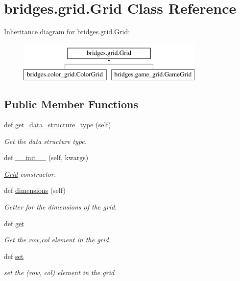 \hypertarget{classbridges_1_1grid_1_1_grid}{}\section{bridges.\+grid.\+Grid Class Reference}
\label{classbridges_1_1grid_1_1_grid}
Inheritance diagram for bridges.\+grid.\+Grid\+:\begin{figure}[H]
\begin{center}
\leavevmode
\includegraphics[height=2.000000cm]{classbridges_1_1grid_1_1_grid}
\end{center}
\end{figure}
\subsection*{Public Member Functions}
\begin{DoxyCompactItemize}
\item 
def \hyperlink{classbridges_1_1grid_1_1_grid_ab1a040a486bbad5259fec54fb885eac1}{get\+\_\+data\+\_\+structure\+\_\+type} (self)
\begin{DoxyCompactList}\small\item\em Get the data structure type. \end{DoxyCompactList}\item 
def \hyperlink{classbridges_1_1grid_1_1_grid_a25587e3c0f450b336fc7bb11fc718c36}{\+\_\+\+\_\+init\+\_\+\+\_\+} (self, kwargs)
\begin{DoxyCompactList}\small\item\em \hyperlink{classbridges_1_1grid_1_1_grid}{Grid} constructor. \end{DoxyCompactList}\item 
def \hyperlink{classbridges_1_1grid_1_1_grid_a48f2107f2a2e970ada851012019a01dc}{dimensions} (self)
\begin{DoxyCompactList}\small\item\em Getter for the dimensions of the grid. \end{DoxyCompactList}\item 
def \hyperlink{classbridges_1_1grid_1_1_grid_a354c049fedceef226ff62aedf78c2a72}{get}
\begin{DoxyCompactList}\small\item\em Get the row,col element in the grid. \end{DoxyCompactList}\item 
def \hyperlink{classbridges_1_1grid_1_1_grid_a40d076434ad49fe29f6a931aba9f442b}{set}
\begin{DoxyCompactList}\small\item\em set the (row, col) element in the grid \end{DoxyCompactList}\end{DoxyCompactItemize}
